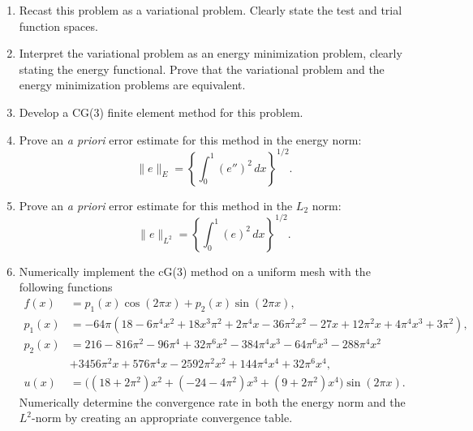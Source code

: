 \documentclass[11pt]{article}
\newlength{\bdsave}
\newcommand{\bdsk}[1]{\setlength{\belowdisplayskip}{#1}%
                      \setlength{\belowdisplayshortskip}{#1}}
\newcommand{\dispBiv}{15.38pt}
\newcommand{\dispBv}{15.38pt}
\begin{document}
\begin{enumerate}

\item Recast this problem as a variational problem. Clearly state the test and
trial function spaces.

\item Interpret the variational problem as an energy minimization problem,
clearly stating the energy functional. Prove that the variational problem and
the energy minimization problems are equivalent.

\item Develop a CG(3) finite element method for this problem.

\item Prove an \emph{a priori} error estimate for this method in the energy
norm:
\bdsk{\dispBiv}
\[
  \|e\|_{E} = \left\{\int_{0}^{1}\left(e''\right)^{2}\,dx\right\}^{1/2} .
\]

\item Prove an \emph{a priori} error estimate for this method in the $L_{2}$
norm:
\bdsk{\dispBv}
\[
  \|e\|_{L^{2}} = \left\{\int_{0}^{1}\left(e\right)^{2}\,dx\right\}^{1/2} .
\]

\item Numerically implement the cG(3) method on a uniform mesh with the
following functions
\bdsk{\bdsave}
\begin{align*}
  f(x) &= p_{1}(x)\cos(2\pi x) + p_{2}(x)\sin(2\pi x),\\
  p_{1}(x) &= -64\pi(18 - 6\pi^{4}x^{2} + 18x^{3}\pi^{2} + 2\pi^{4}x
              - 36\pi^{2}x^{2} - 27x + 12\pi^{2}x + 4\pi^{4}x^{3} + 3\pi^{2}),\\
  p_{2}(x) &= 216 - 816\pi^{2} - 96\pi^{4} + 32\pi^{6}x^{2} - 384\pi^{4}x^{3}
              - 64\pi^{6}x^{3} - 288\pi^{4}x^{2}\\
           &+ 3456\pi^{2}x + 576\pi^{4}x - 2592\pi^{2}x^{2}
              + 144\pi^{4}x^{4} + 32\pi^{6}x^{4},\\
  u(x) &= \bigl((18 + 2\pi^{2})x^{2} + (-24 - 4\pi^{2})x^{3}
           + (9 + 2\pi^{2})x^{4}\bigr)\sin(2\pi x).
\end{align*}
Numerically determine the convergence rate in both the energy norm and the
$L^{2}$-norm by creating an appropriate convergence table.

\end{enumerate}
\end{document}
